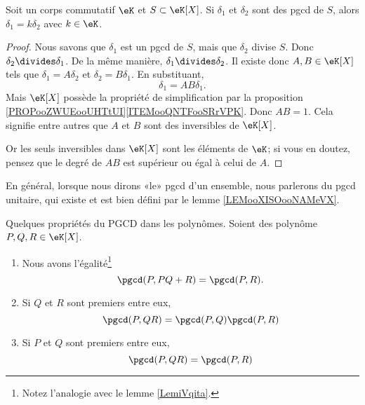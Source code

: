 \begin{lemma}      \label{LEMooXISOooNAMeVX}
    Soit un corps commutatif \( \eK\) et \( S\subset \eK[X]\). Si \( \delta_1\) et \( \delta_2\) sont des pgcd de \( S\), alors \( \delta_1=k\delta_2\) avec \( k\in \eK\).
\end{lemma}

\begin{proof}
    Nous savons que \( \delta_1\) est un pgcd de \( S\), mais que \( \delta_2\) divise \( S\). Donc \( \delta_2\divides \delta_1\). De la même manière, \( \delta_1\divides \delta_2\). Il existe donc \( A,B\in \eK[X]\) tels que \( \delta_1=A\delta_2\) et \( \delta_2=B\delta_1\). En substituant,
    \begin{equation}
        \delta_1=AB\delta_1.
    \end{equation}
    Mais \( \eK[X]\) possède la propriété de simplification par la proposition \ref{PROPooZWUEooUHTtUI}\ref{ITEMooQNTFooSRrVPK}. Donc \( AB=1\). Cela signifie entre autres que \( A\) et \( B\) sont des inversibles de \( \eK[X]\).

    Or les seuls inversibles dans \( \eK[X]\) sont les éléments de \( \eK\); si vous en doutez, pensez que le degré de \( AB\) est supérieur ou égal à celui de \( A\).
\end{proof}

\begin{normaltext}
    En général, lorsque nous dirons «le» pgcd d'un ensemble, nous parlerons du pgcd unitaire, qui existe et est bien défini par le lemme \ref{LEMooXISOooNAMeVX}.
\end{normaltext}

\begin{lemma}   \label{LemUELTuwK}
    Quelques propriétés du PGCD dans les polynômes. Soient des polynôme \( P,Q,R\in \eK[X]\).
    \begin{enumerate}
        \item       \label{ITEMooBPOZooYeFGjl}
            Nous avons l'égalité\footnote{Notez l'analogie avec le lemme \ref{LemiVqita}.}
            \begin{equation}
                \pgcd(P,PQ+R)=\pgcd(P,R).
            \end{equation}
        \item
            Si \( Q \) et \( R\) sont premiers entre eux,
            \begin{equation}
                \pgcd(P,QR)=\pgcd(P,Q)\pgcd(P,R)
            \end{equation}
        \item       \label{ITEMooYXAHooXibkgV}
            Si \( P\) et \( Q\) sont premiers entre eux,
            \begin{equation}
                \pgcd(P,QR)=\pgcd(P,R)
            \end{equation}
    \end{enumerate}
\end{lemma}

